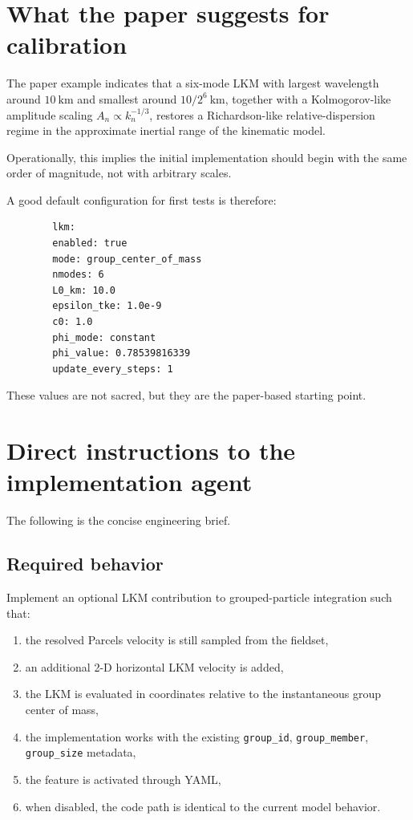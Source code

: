 \documentclass[11pt,a4paper]{article}
\begin{document}
	\section{What the paper suggests for calibration}
	
	The paper example indicates that a six-mode LKM with largest wavelength around $10\ \mathrm{km}$ and smallest around $10/2^6\ \mathrm{km}$, together with a Kolmogorov-like amplitude scaling $A_n \propto k_n^{-1/3}$, restores a Richardson-like relative-dispersion regime in the approximate inertial range of the kinematic model.
	
	Operationally, this implies the initial implementation should begin with the same order of magnitude, not with arbitrary scales.
	
	A good default configuration for first tests is therefore:
	\begin{verbatim}
		lkm:
		enabled: true
		mode: group_center_of_mass
		nmodes: 6
		L0_km: 10.0
		epsilon_tke: 1.0e-9
		c0: 1.0
		phi_mode: constant
		phi_value: 0.78539816339
		update_every_steps: 1
	\end{verbatim}
	
	These values are not sacred, but they are the paper-based starting point.
	
	\section{Direct instructions to the implementation agent}
	
	The following is the concise engineering brief.
	
	\subsection*{Required behavior}
	
	Implement an optional LKM contribution to grouped-particle integration such that:
	\begin{enumerate}[label=\arabic*.]
		\item the resolved Parcels velocity is still sampled from the fieldset,
		\item an additional 2-D horizontal LKM velocity is added,
		\item the LKM is evaluated in coordinates relative to the instantaneous group center of mass,
		\item the implementation works with the existing \texttt{group\_id}, \texttt{group\_member}, \texttt{group\_size} metadata,
		\item the feature is activated through YAML,
		\item when disabled, the code path is identical to the current model behavior.
	\end{enumerate}
	
\end{document}
